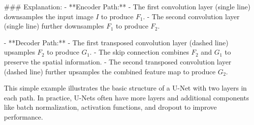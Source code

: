 ### Explanation:
- **Encoder Path:**
  - The first convolution layer (single line) downsamples the input image \( I \) to produce \( F_1 \).
  - The second convolution layer (single line) further downsamples \( F_1 \) to produce \( F_2 \).

- **Decoder Path:**
  - The first transposed convolution layer (dashed line) upsamples \( F_2 \) to produce \( G_1 \).
  - The skip connection combines \( F_2 \) and \( G_1 \) to preserve the spatial information.
  - The second transposed convolution layer (dashed line) further upsamples the combined feature map to produce \( G_2 \).

This simple example illustrates the basic structure of a U-Net with two layers in each path. In practice, U-Nets often have more layers and additional components like batch normalization, activation functions, and dropout to improve performance.